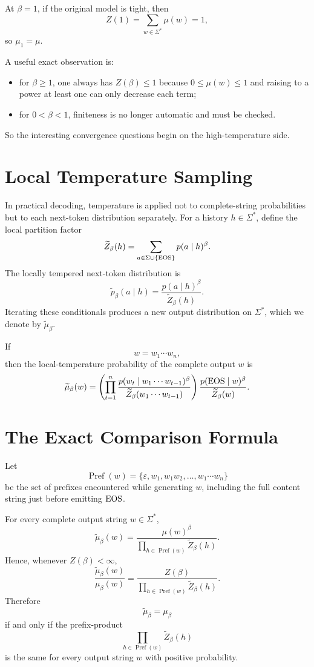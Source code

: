 At $\beta=1$, if the original model is tight, then
\[
  Z(1) = \sum_{w \in \Sigma^*} \mu(w) = 1,
\]
so $\mu_1=\mu$.

A useful exact observation is:
\begin{itemize}
  \item for $\beta \ge 1$, one always has $Z(\beta) \le 1$ because $0 \le \mu(w) \le 1$ and raising to a power at least one can only decrease each term;
  \item for $0<\beta<1$, finiteness is no longer automatic and must be checked.
\end{itemize}
So the interesting convergence questions begin on the high-temperature side.

\section{Local Temperature Sampling}

In practical decoding, temperature is applied not to complete-string probabilities but to each next-token distribution separately. For a history $h \in \Sigma^*$, define the local partition factor
\[
  \widetilde Z_\beta(h) = \sum_{a \in \Sigma \cup \{\operatorname{EOS}\}} p(a \mid h)^\beta.
\]
The locally tempered next-token distribution is
\[
  \widetilde p_\beta(a \mid h) = \frac{p(a \mid h)^\beta}{\widetilde Z_\beta(h)}.
\]
Iterating these conditionals produces a new output distribution on $\Sigma^*$, which we denote by $\widetilde\mu_\beta$.

If
\[
  w = w_1\cdots w_n,
\]
then the local-temperature probability of the complete output $w$ is
\[
  \widetilde\mu_\beta(w)
  = \left(\prod_{t=1}^n \frac{p(w_t \mid w_1\cdots w_{t-1})^\beta}{\widetilde Z_\beta(w_1\cdots w_{t-1})}\right)
    \frac{p(\operatorname{EOS} \mid w)^\beta}{\widetilde Z_\beta(w)}.
\]

\section{The Exact Comparison Formula}

Let
\[
  \operatorname{Pref}(w) = \{\varepsilon, w_1, w_1w_2, \dots, w_1\cdots w_n\}
\]
be the set of prefixes encountered while generating $w$, including the full content string just before emitting $\operatorname{EOS}$.

\begin{proposition}
For every complete output string $w \in \Sigma^*$,
\[
  \widetilde\mu_\beta(w) = \frac{\mu(w)^\beta}{\prod_{h \in \operatorname{Pref}(w)} \widetilde Z_\beta(h)}.
\]
Hence, whenever $Z(\beta)<\infty$,
\[
  \frac{\widetilde\mu_\beta(w)}{\mu_\beta(w)}
  = \frac{Z(\beta)}{\prod_{h \in \operatorname{Pref}(w)} \widetilde Z_\beta(h)}.
\]
Therefore
\[
  \widetilde\mu_\beta = \mu_\beta
\]
if and only if the prefix-product
\[
  \prod_{h \in \operatorname{Pref}(w)} \widetilde Z_\beta(h)
\]
is the same for every output string $w$ with positive probability.
\end{proposition}

